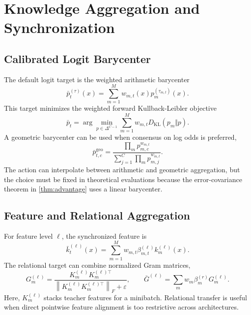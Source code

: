 \documentclass[10pt,twocolumn,a4paper]{article}
\newcommand{\KL}{D_{\mathrm{KL}}}
\newcommand{\simplex}{\Delta}
\begin{document}
\section{Knowledge Aggregation and Synchronization}
\label{sec:sync}

\subsection{Calibrated Logit Barycenter}

The default logit target is the weighted arithmetic barycenter
\begin{equation}
 \bar p_t^{(\tau)}(x)=\sum_{m=1}^{M}w_{m,t}(x)p_m^{(\tau_{m,t})}(x).
\label{eq:logitbary}
\end{equation}
This target minimizes the weighted forward Kullback-Leibler objective
\begin{equation}
 \bar p_t=\arg\min_{p\in\simplex^{C-1}}
 \sum_{m=1}^{M}w_{m,t}\KL(p_m\Vert p).
\label{eq:forwardbary}
\end{equation}
A geometric barycenter can be used when consensus on log odds is preferred,
\begin{equation}
 \bar p_{t,c}^{\mathrm{geo}}
 =\frac{\prod_m p_{m,c}^{w_{m,t}}}{\sum_{j=1}^{C}\prod_m p_{m,j}^{w_{m,t}}}.
\label{eq:geobary}
\end{equation}
The action can interpolate between arithmetic and geometric aggregation, but the choice must be fixed in theoretical evaluations because the error-covariance theorem in \cref{thm:advantage} uses a linear barycenter.

\subsection{Feature and Relational Aggregation}

For feature level \(\ell\), the synchronized feature is
\begin{equation}
 \bar k_t^{(\ell)}(x)=\sum_{m=1}^{M}w_{m,t}\beta_{m,t}^{(\ell)}k_m^{(\ell)}(x).
\label{eq:featureagg}
\end{equation}
The relational target can combine normalized Gram matrices,
\begin{equation}
 G_m^{(\ell)}=\frac{K_m^{(\ell)}K_m^{(\ell)\top}}
 {\left\|K_m^{(\ell)}K_m^{(\ell)\top}\right\|_F+\varepsilon},
\qquad
 \bar G^{(\ell)}=\sum_m w_m\beta_{m}^{(r)}G_m^{(\ell)}.
\label{eq:relationagg}
\end{equation}
Here, \(K_m^{(\ell)}\) stacks teacher features for a minibatch. Relational transfer is useful when direct pointwise feature alignment is too restrictive across architectures.
\end{document}
